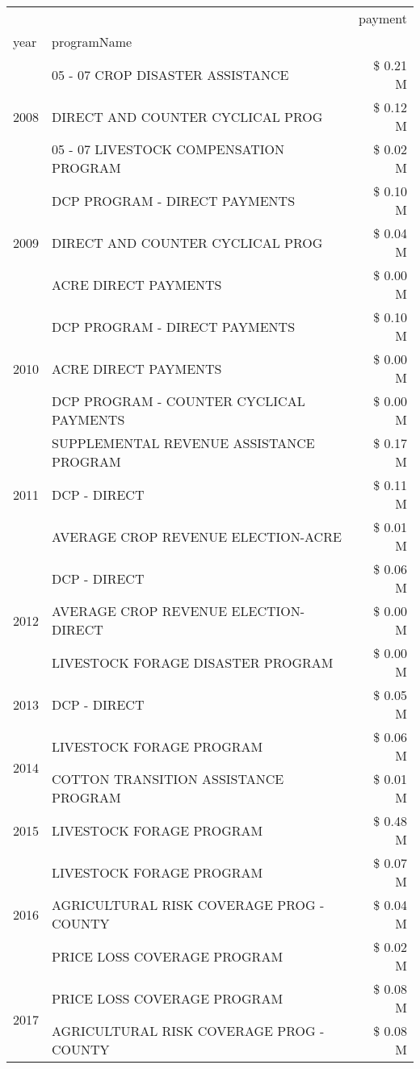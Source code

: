 \begin{tabular}{llr}
\toprule
 &  & payment \\
year & programName &  \\
\midrule
\multirow[t]{3}{*}{2008} & 05 - 07 CROP DISASTER ASSISTANCE & \$ 0.21 M \\
 & DIRECT AND COUNTER CYCLICAL PROG & \$ 0.12 M \\
 & 05 - 07 LIVESTOCK COMPENSATION PROGRAM & \$ 0.02 M \\
\cline{1-3}
\multirow[t]{3}{*}{2009} & DCP PROGRAM - DIRECT PAYMENTS & \$ 0.10 M \\
 & DIRECT AND COUNTER CYCLICAL PROG & \$ 0.04 M \\
 & ACRE DIRECT PAYMENTS & \$ 0.00 M \\
\cline{1-3}
\multirow[t]{3}{*}{2010} & DCP PROGRAM - DIRECT PAYMENTS & \$ 0.10 M \\
 & ACRE DIRECT PAYMENTS & \$ 0.00 M \\
 & DCP PROGRAM - COUNTER CYCLICAL PAYMENTS & \$ 0.00 M \\
\cline{1-3}
\multirow[t]{3}{*}{2011} & SUPPLEMENTAL REVENUE ASSISTANCE PROGRAM & \$ 0.17 M \\
 & DCP - DIRECT & \$ 0.11 M \\
 & AVERAGE CROP REVENUE ELECTION-ACRE & \$ 0.01 M \\
\cline{1-3}
\multirow[t]{3}{*}{2012} & DCP - DIRECT & \$ 0.06 M \\
 & AVERAGE CROP REVENUE ELECTION-DIRECT & \$ 0.00 M \\
 & LIVESTOCK FORAGE DISASTER PROGRAM & \$ 0.00 M \\
\cline{1-3}
2013 & DCP - DIRECT & \$ 0.05 M \\
\cline{1-3}
\multirow[t]{2}{*}{2014} & LIVESTOCK FORAGE PROGRAM & \$ 0.06 M \\
 & COTTON TRANSITION ASSISTANCE PROGRAM & \$ 0.01 M \\
\cline{1-3}
2015 & LIVESTOCK FORAGE PROGRAM & \$ 0.48 M \\
\cline{1-3}
\multirow[t]{3}{*}{2016} & LIVESTOCK FORAGE PROGRAM & \$ 0.07 M \\
 & AGRICULTURAL RISK COVERAGE PROG - COUNTY & \$ 0.04 M \\
 & PRICE LOSS COVERAGE PROGRAM & \$ 0.02 M \\
\cline{1-3}
\multirow[t]{2}{*}{2017} & PRICE LOSS COVERAGE PROGRAM & \$ 0.08 M \\
 & AGRICULTURAL RISK COVERAGE PROG - COUNTY & \$ 0.08 M \\

\end{tabular}
